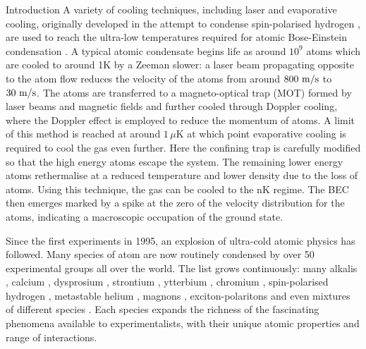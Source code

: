 \begin{chapter}{\label{cha:bose_gases}Introduction}
A variety of cooling techniques, including laser \cite{billphillips,chu98,Cohen-Tannoudji} and evaporative \cite{PhysRevB.34.3476} cooling, originally developed in the attempt to condense spin-polarised hydrogen \cite{Hecht59, PhysRevLett.44.164, Silvera86}, are used to reach the ultra-low temperatures required for atomic Bose-Einstein condensation \cite{Pethick,RevModPhys.74.1131,RevModPhys.74.875}. A typical atomic condensate begins life as around $10^9$ atoms which are cooled to around 1K by a Zeeman slower: a laser beam propagating opposite to the atom flow reduces the velocity of the atoms from around $800~\rm{m/s}$ to $30~\rm{m/s}$. The atoms are transferred to a magneto-optical trap (MOT) formed by laser beams and magnetic fields and further cooled through Doppler cooling, where the Doppler effect is employed to reduce the momentum of atoms. A limit of this method is reached at around $1\,\mu$K \cite{Pethick} at which point evaporative cooling is required to cool the gas even further. Here the confining trap is carefully modified so that the high energy atoms escape the system. The remaining lower energy atoms rethermalise at a reduced temperature and lower density due to the loss of atoms. Using this technique, the gas can be cooled to the nK regime. The BEC then emerges marked by a spike at the zero of the velocity distribution for the atoms, indicating a macroscopic occupation of the ground state. 

Since the first experiments in 1995, an explosion of ultra-cold atomic physics has followed. Many species of atom are now routinely condensed by over 50 experimental groups all over the world. The list grows continuously: many alkalis \cite{Anderson198,PhysRevLett.75.3969,PhysRevLett.75.1687,PhysRevLett.78.985,PhysRevLett.85.1795,Modugno,Robert461,Weber232}, calcium \cite{PhysRevLett.103.130401}, dysprosium \cite{PhysRevLett.107.190401}, strontium \cite{PhysRevLett.103.200401,PhysRevLett.103.200402, PhysRevA.82.041602, PhysRevA.81.051601}, ytterbium \cite{PhysRevLett.91.040404}, chromium \cite{PhysRevLett.94.160401}, spin-polarised hydrogen \cite{PhysRevLett.81.3811}, metastable helium \cite{PhysRevLett.86.3459}, magnons \cite{Mathew11}, exciton-polaritons \cite{Kasprzak06} and even mixtures of different species \cite{PhysRevLett.89.053202, PhysRevLett.89.190404, PhysRevLett.100.210402,PhysRevA.84.011603}. Each species expands the richness of the fascinating phenomena available to experimentalists, with their unique atomic properties and range of interactions.


\end{chapter}
